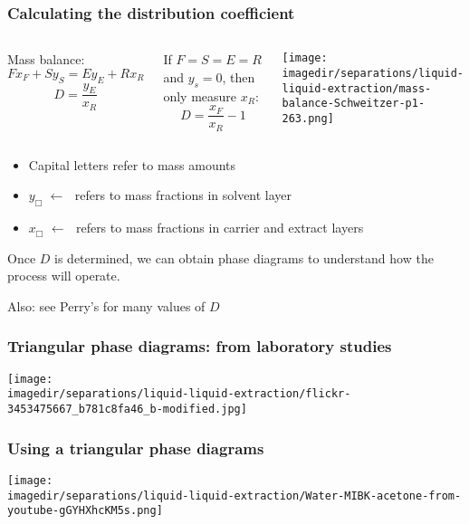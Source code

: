 \begin{frame}\frametitle{Calculating the distribution coefficient}
	\begin{columns}[t]
			Mass balance:
			\[ F x_F + S y_S = E y_E + R x_R \]
			\[ D = \frac{y_E}{x_R} \]

			\vspace{12pt}
			If $F = S = E = R$ and $y_s = 0$, then only measure $x_R$:
			\[ D = \frac{x_F}{x_R} - 1\]
			\begin{center}
				\texttt{[image: \\imagedir/separations/liquid-liquid-extraction/mass-balance-Schweitzer-p1-263.png]}
			\end{center}
	\end{columns}
	\begin{itemize}
		\item	Capital letters refer to mass amounts
		\item	$y_\Box \,\, \leftarrow\,\,$  refers to mass fractions in solvent layer
		\item	$x_\Box \,\, \leftarrow\,\,$  refers to mass fractions in carrier and extract layers
	\end{itemize}
	Once $D$ is determined, we can obtain phase diagrams to understand how the process will operate.
	
	\vspace{12pt}
	Also: see Perry's for many values of $D$
\end{frame}

\begin{frame}\frametitle{Triangular phase diagrams: from laboratory studies}
	\begin{center}
		\texttt{[image: \\imagedir/separations/liquid-liquid-extraction/flickr-3453475667\_b781c8fa46\_b-modified.jpg]}
	\end{center}
	\vspace{-12pt}
\end{frame}

\begin{frame}\frametitle{Using a triangular phase diagrams}
	\begin{center}
		\texttt{[image: \\imagedir/separations/liquid-liquid-extraction/Water-MIBK-acetone-from-youtube-gGYHXhcKM5s.png]}
	\end{center}
	\vspace{-12pt}
\end{frame}

